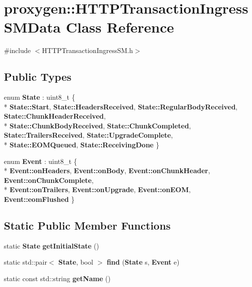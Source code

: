 \section{proxygen\+:\+:H\+T\+T\+P\+Transaction\+Ingress\+S\+M\+Data Class Reference}
\label{classproxygen_1_1HTTPTransactionIngressSMData}


{\ttfamily \#include $<$H\+T\+T\+P\+Transaction\+Ingress\+S\+M.\+h$>$}

\subsection*{Public Types}
\begin{DoxyCompactItemize}
\item 
enum {\bf State} \+: uint8\+\_\+t \{ \\*
{\bf State\+::\+Start}, 
{\bf State\+::\+Headers\+Received}, 
{\bf State\+::\+Regular\+Body\+Received}, 
{\bf State\+::\+Chunk\+Header\+Received}, 
\\*
{\bf State\+::\+Chunk\+Body\+Received}, 
{\bf State\+::\+Chunk\+Completed}, 
{\bf State\+::\+Trailers\+Received}, 
{\bf State\+::\+Upgrade\+Complete}, 
\\*
{\bf State\+::\+E\+O\+M\+Queued}, 
{\bf State\+::\+Receiving\+Done}
 \}
\item 
enum {\bf Event} \+: uint8\+\_\+t \{ \\*
{\bf Event\+::on\+Headers}, 
{\bf Event\+::on\+Body}, 
{\bf Event\+::on\+Chunk\+Header}, 
{\bf Event\+::on\+Chunk\+Complete}, 
\\*
{\bf Event\+::on\+Trailers}, 
{\bf Event\+::on\+Upgrade}, 
{\bf Event\+::on\+E\+OM}, 
{\bf Event\+::eom\+Flushed}
 \}
\end{DoxyCompactItemize}
\subsection*{Static Public Member Functions}
\begin{DoxyCompactItemize}
\item 
static {\bf State} {\bf get\+Initial\+State} ()
\item 
static std\+::pair$<$ {\bf State}, bool $>$ {\bf find} ({\bf State} s, {\bf Event} e)
\item 
static const std\+::string {\bf get\+Name} ()
\end{DoxyCompactItemize}


